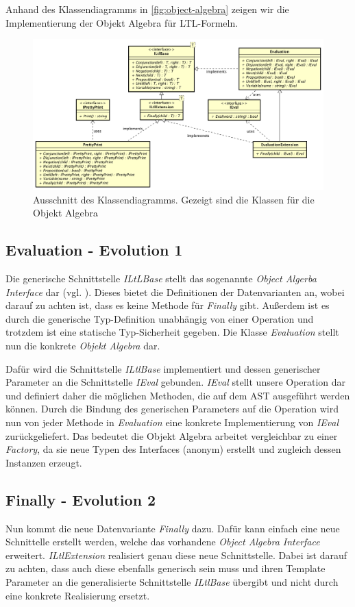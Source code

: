 \documentclass{llncs}
\begin{document}
Anhand des Klassendiagramms in \autoref{fig:object-algebra} zeigen wir die Implementierung der Objekt Algebra für LTL-Formeln.

\begin{figure}
	\centering
	\includegraphics[width=\textwidth]{images/ObjectAlgebra.png}
	\caption{Ausschnitt des Klassendiagramms. Gezeigt sind die Klassen für die Objekt Algebra}
	\label{fig:object-algebra}
\end{figure}

\subsection{Evaluation - Evolution 1}
Die generische Schnittstelle \emph{ILtLBase} stellt das sogenannte \emph{Object Algerba Interface} dar (vgl. \cite[Abschnitt 3 S.6]{Oliveira12}).
Dieses bietet die Definitionen der Datenvarianten an, wobei darauf zu achten ist, dass es keine Methode für \emph{Finally} gibt.
Außerdem ist es durch die generische Typ-Definition unabhängig von einer Operation und trotzdem ist eine statische Typ-Sicherheit gegeben.
Die Klasse \emph{Evaluation} stellt nun die konkrete \emph{Objekt Algebra} dar.

Dafür wird die Schnittstelle \emph{ILtlBase} implementiert und dessen generischer Parameter an die Schnittstelle \emph{IEval} gebunden.
\emph{IEval} stellt unsere Operation dar und definiert daher die möglichen Methoden, die auf dem AST ausgeführt werden können.
Durch die Bindung des generischen Parameters auf die Operation wird nun von jeder Methode in \emph{Evaluation} eine konkrete Implementierung von \emph{IEval} zurückgeliefert.
Das bedeutet die Objekt Algebra arbeitet vergleichbar zu einer \emph{Factory}, da sie neue Typen des Interfaces (anonym) erstellt und zugleich dessen Instanzen erzeugt.

\subsection{Finally - Evolution 2}
Nun kommt die neue Datenvariante \emph{Finally} dazu. Dafür kann einfach eine neue Schnittelle erstellt werden, welche das vorhandene \emph{Object Algebra Interface} erweitert.
\emph{ILtlExtension} realisiert genau diese neue Schnittstelle. Dabei ist darauf zu achten,
dass auch diese ebenfalls generisch sein muss und ihren Template Parameter an die generalisierte Schnittstelle \emph{ILtlBase} übergibt und nicht durch eine konkrete Realisierung ersetzt.
\end{document}
